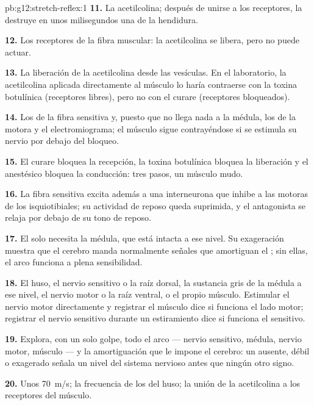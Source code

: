 \begin{solution}{pb:g12:stretch-reflex:1}
\textbf{11.} La acetilcolina; después de unirse a los receptores, la
destruye en unos milisegundos una  de la hendidura.

\textbf{12.} Los receptores de la fibra muscular: la acetilcolina se
libera, pero no puede actuar.

\textbf{13.} La liberación de la acetilcolina desde las vesículas. En
el laboratorio, la acetilcolina aplicada directamente al músculo lo
haría contraerse con la toxina botulínica (receptores libres), pero no
con el curare (receptores bloqueados).

\textbf{14.} Los  de la fibra sensitiva y,
puesto que no llega nada a la médula, los de la  motora y el
electromiograma; el músculo sigue contrayéndose si se estimula su
nervio por debajo del bloqueo.

\textbf{15.} El curare bloquea la recepción, la toxina botulínica
bloquea la liberación y el anestésico bloquea la conducción: tres
pasos, un músculo mudo.

\textbf{16.} La fibra sensitiva excita además a una interneurona que
inhibe a las  motoras de los isquiotibiales; su actividad de
reposo queda suprimida, y el antagonista se relaja por debajo de su
tono de reposo.

\textbf{17.} El  solo necesita la médula, que está intacta a ese
nivel. Su exageración muestra que el cerebro manda normalmente señales
que amortiguan el ; sin ellas, el arco funciona a plena
sensibilidad.

\textbf{18.} El huso, el nervio sensitivo o la raíz dorsal, la
sustancia gris de la médula a ese nivel, el nervio motor o la raíz
ventral, o el propio músculo. Estimular el nervio motor directamente y
registrar el músculo dice si funciona el lado motor; registrar el
nervio sensitivo durante un estiramiento dice si funciona el sensitivo.

\textbf{19.} Explora, con un solo golpe, todo el arco --- nervio
sensitivo, médula, nervio motor, músculo --- y la amortiguación que le
impone el cerebro: un  ausente, débil o exagerado señala un
nivel del sistema nervioso antes que ningún otro signo.

\textbf{20.} Unos \qty{70}{m/s}; la frecuencia de los  del huso; la unión de la acetilcolina a los receptores del
músculo.
\end{solution}

